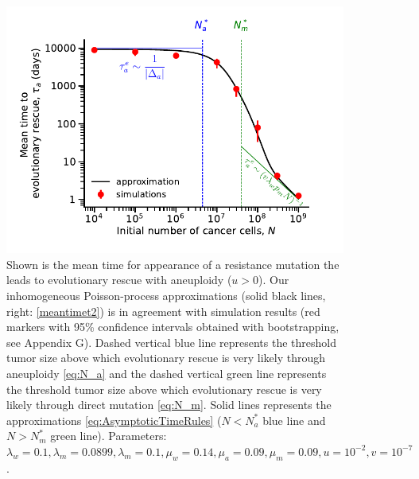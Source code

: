\documentclass[12pt]{extarticle}
\begin{document}
\begin{figure}
\vspace*{1\baselineskip}
\includegraphics[width=1\textwidth]{Figures/EvolutionaryRescueTimeComplete.pdf}
\caption{Shown is the mean time for appearance of a resistance mutation the leads to evolutionary rescue with aneuploidy ($u>0$). Our inhomogeneous Poisson-process approximations (solid black lines, right: \cref{meantimet2}) is in agreement with simulation results (red markers with 95\% confidence intervals obtained with bootstrapping, see Appendix G). Dashed vertical blue line represents the threshold tumor size above which evolutionary rescue is very likely through aneuploidy \cref{eq:N_a} and the dashed vertical green line represents the threshold tumor size above which evolutionary rescue is very likely through direct mutation \cref{eq:N_m}. Solid lines represents the approximations \cref{eq:AsymptoticTimeRules} ($N<N_a^*$ blue line and $N>N_m^*$ green line). 
Parameters: $\lambda_w=0.1,\lambda_m=0.0899,\lambda_m=0.1,\mu_w=0.14,\mu_a=0.09,\mu_m=0.09, u=10^{-2}, v=10^{-7}$.}
\label{EvolutionaryRescueTimeComplete}
\end{figure}
\end{document}
